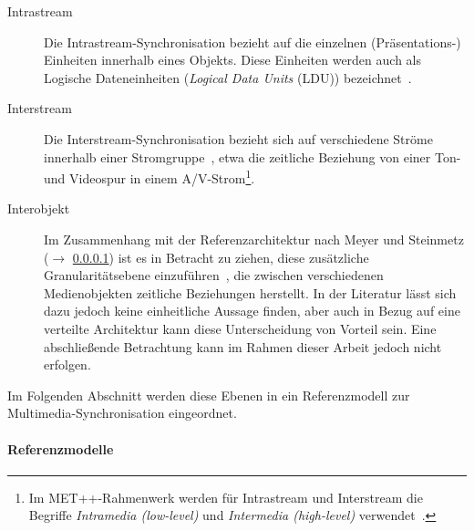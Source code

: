   \begin{description}
    \item[Intrastream] Die Intrastream-Synchronisation bezieht auf die einzelnen \mbox{(Präsentations-)} Einheiten innerhalb eines Objekts. Diese Einheiten werden auch als Logische Dateneinheiten (\emph{Logical Data Units} (LDU)) bezeichnet~\citep{steinmetz1990spm}.
    \item[Interstream] Die Interstream-Synchronisation bezieht sich auf verschiedene Ströme innerhalb einer Stromgruppe~\citep{multimedia_technologie}, etwa die zeitliche Beziehung von einer Ton- und Videospur in einem A/V-Strom\footnote{Im MET++-Rahmenwerk werden für Intrastream und Interstream die Begriffe \emph{Intramedia (low-level)} und \emph{Intermedia (high-level)} verwendet~\citep[S. 73]{ackermann1996doo}.}.
    \item[Interobjekt] Im Zusammenhang mit der Referenzarchitektur nach Meyer und Steinmetz ($\to$ \ref{par:referenzmodelle}) ist es in Betracht zu ziehen, diese zusätzliche Granularitätsebene einzuführen~\citep[S. 264]{wu2001svo}, die zwischen verschiedenen Medienobjekten zeitliche Beziehungen herstellt. In der Literatur lässt sich dazu jedoch keine einheitliche Aussage finden, aber auch in Bezug auf eine verteilte Architektur kann diese Unterscheidung von Vorteil sein. Eine abschließende Betrachtung kann im Rahmen dieser Arbeit jedoch nicht erfolgen.
  \end{description}
  
  Im Folgenden Abschnitt werden diese Ebenen in ein Referenzmodell zur Multimedia-Synchronisation eingeordnet.


\paragraph{Referenzmodelle} %
\label{par:referenzmodelle}

